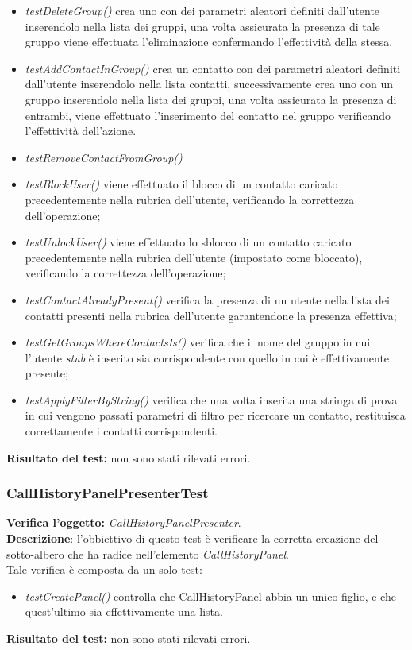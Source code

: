 \begin{itemize}
\item \textit{testDeleteGroup() } crea uno  con dei parametri aleatori definiti dall'utente inserendolo nella lista dei gruppi, una volta assicurata la presenza di tale gruppo viene effettuata l'eliminazione confermando l'effettività della stessa.
\item \textit{testAddContactInGroup() } crea un contatto  con dei parametri aleatori definiti dall'utente inserendolo nella lista contatti, successivamente crea uno  con un gruppo inserendolo nella lista dei gruppi, una volta assicurata la presenza di entrambi, viene effettuato l'inserimento del contatto nel gruppo verificando l'effettività dell'azione.
\item \textit{testRemoveContactFromGroup() }
\item \textit{testBlockUser() } viene effettuato il blocco di un contatto caricato precedentemente nella rubrica dell'utente, verificando la correttezza dell'operazione;
\item \textit{testUnlockUser() } viene effettuato lo sblocco di un contatto caricato precedentemente nella rubrica dell'utente (impostato come bloccato), verificando la correttezza dell'operazione;
\item \textit{testContactAlreadyPresent() } verifica la presenza di un utente nella lista dei contatti presenti nella rubrica dell'utente garantendone la presenza effettiva;
\item \textit{testGetGroupsWhereContactsIs() } verifica che il nome del gruppo in cui l'utente \textit{stub} è inserito sia corrispondente con quello in cui è effettivamente presente;
\item \textit{testApplyFilterByString() } verifica che una volta inserita una stringa di prova in cui vengono passati parametri di filtro per ricercare un contatto, restituisca correttamente i contatti corrispondenti.

\end{itemize}
\textbf{Risultato del test:} non sono stati rilevati errori.

\subsubsection{CallHistoryPanelPresenterTest}
\textbf{Verifica l'oggetto:} \textit{CallHistoryPanelPresenter}.\\
\textbf{Descrizione}: l'obbiettivo di questo test è verificare la corretta creazione del sotto-albero che ha radice nell'elemento \textit{CallHistoryPanel}.\\
Tale verifica è composta da un solo test:
\begin{itemize}
\item \textit{testCreatePanel() } controlla che CallHistoryPanel abbia un unico figlio, e che quest'ultimo sia effettivamente una lista.
\end{itemize}
\textbf{Risultato del test:} non sono stati rilevati errori.

